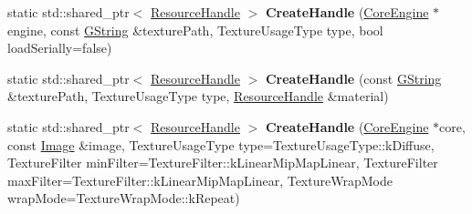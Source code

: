 \begin{DoxyCompactItemize}
\mbox{\label{classrev_1_1_texture_ad65abcc1434c73e12695067c1a69ef4b}} 
static std\+::shared\+\_\+ptr$<$ \mbox{\hyperlink{classrev_1_1_resource_handle}{Resource\+Handle}} $>$ {\bfseries Create\+Handle} (\mbox{\hyperlink{classrev_1_1_core_engine}{Core\+Engine}} $\ast$engine, const \mbox{\hyperlink{classrev_1_1_g_string}{G\+String}} \&texture\+Path, Texture\+Usage\+Type type, bool load\+Serially=false)
\item 
\mbox{\label{classrev_1_1_texture_a434cca08735844e5486350c7f69530f7}} 
static std\+::shared\+\_\+ptr$<$ \mbox{\hyperlink{classrev_1_1_resource_handle}{Resource\+Handle}} $>$ {\bfseries Create\+Handle} (const \mbox{\hyperlink{classrev_1_1_g_string}{G\+String}} \&texture\+Path, Texture\+Usage\+Type type, \mbox{\hyperlink{classrev_1_1_resource_handle}{Resource\+Handle}} \&material)
\item 
\mbox{\label{classrev_1_1_texture_a96317aaecdeba4ce665559ba12d9a9df}} 
static std\+::shared\+\_\+ptr$<$ \mbox{\hyperlink{classrev_1_1_resource_handle}{Resource\+Handle}} $>$ {\bfseries Create\+Handle} (\mbox{\hyperlink{classrev_1_1_core_engine}{Core\+Engine}} $\ast$core, const \mbox{\hyperlink{classrev_1_1_image}{Image}} \&image, Texture\+Usage\+Type type=Texture\+Usage\+Type\+::k\+Diffuse, Texture\+Filter min\+Filter=Texture\+Filter\+::k\+Linear\+Mip\+Map\+Linear, Texture\+Filter max\+Filter=Texture\+Filter\+::k\+Linear\+Mip\+Map\+Linear, Texture\+Wrap\+Mode wrap\+Mode=Texture\+Wrap\+Mode\+::k\+Repeat)
\end{DoxyCompactItemize}
